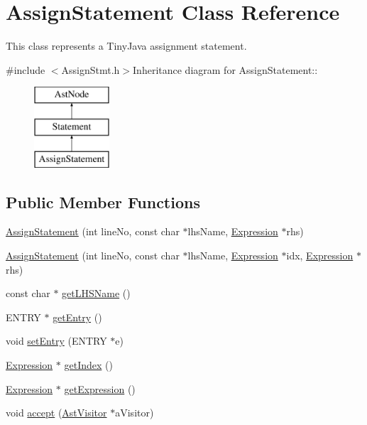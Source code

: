 \hypertarget{classAssignStatement}{
\section{AssignStatement Class Reference}
\label{classAssignStatement}
}


This class represents a TinyJava assignment statement.  


{\ttfamily \#include $<$AssignStmt.h$>$}Inheritance diagram for AssignStatement::\begin{figure}[H]
\begin{center}
\leavevmode
\includegraphics[height=3cm]{classAssignStatement}
\end{center}
\end{figure}
\subsection*{Public Member Functions}
\begin{DoxyCompactItemize}
\item 
\hyperlink{classAssignStatement_ad2cc7d861f58d9ebe7302aeca01975fb}{AssignStatement} (int lineNo, const char $\ast$lhsName, \hyperlink{classExpression}{Expression} $\ast$rhs)
\item 
\hyperlink{classAssignStatement_a54299cdd3f930c738a74bbff01200d9d}{AssignStatement} (int lineNo, const char $\ast$lhsName, \hyperlink{classExpression}{Expression} $\ast$idx, \hyperlink{classExpression}{Expression} $\ast$rhs)
\item 
const char $\ast$ \hyperlink{classAssignStatement_a9c6b348f0bcd4ca190414710ddeb085f}{getLHSName} ()
\item 
ENTRY $\ast$ \hyperlink{classAssignStatement_a4b640ab15accc35753ef8ae72c7b90fc}{getEntry} ()
\item 
void \hyperlink{classAssignStatement_a8a0b32169f7557553d24582f5b893ba2}{setEntry} (ENTRY $\ast$e)
\item 
\hyperlink{classExpression}{Expression} $\ast$ \hyperlink{classAssignStatement_a89a46624c82d07ce4b4f4819c2d7df81}{getIndex} ()
\item 
\hyperlink{classExpression}{Expression} $\ast$ \hyperlink{classAssignStatement_a488cf9857d458c808b97471a1a3789df}{getExpression} ()
\item 
void \hyperlink{classAssignStatement_a178a2773781301e16eebfd3d420dc98d}{accept} (\hyperlink{classAstVisitor}{AstVisitor} $\ast$aVisitor)
\end{DoxyCompactItemize}


